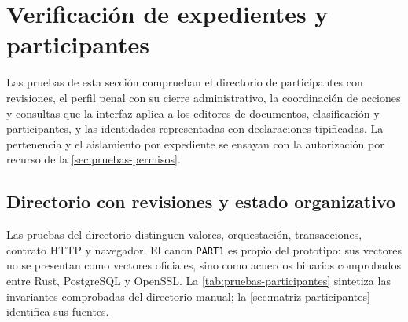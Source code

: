 
\section{Verificación de expedientes y participantes}\label{sec:pruebas-expedientes}

Las pruebas de esta sección comprueban el directorio de participantes con revisiones, el perfil penal con su cierre administrativo, la coordinación de acciones y consultas que la interfaz aplica a los editores de documentos, clasificación y participantes, y las identidades representadas con declaraciones tipificadas. La pertenencia y el aislamiento por expediente se ensayan con la autorización por recurso de la \cref{sec:pruebas-permisos}.

\subsection{Directorio con revisiones y estado organizativo}\label{sec:pruebas-participantes}

Las pruebas del directorio distinguen valores, orquestación, transacciones, contrato HTTP y navegador. El canon \texttt{PART1} es propio del prototipo: sus vectores no se presentan como vectores oficiales, sino como acuerdos binarios comprobados entre Rust, PostgreSQL y OpenSSL. La \cref{tab:pruebas-participantes} sintetiza las invariantes comprobadas del directorio manual; la \cref{sec:matriz-participantes} identifica sus fuentes.

